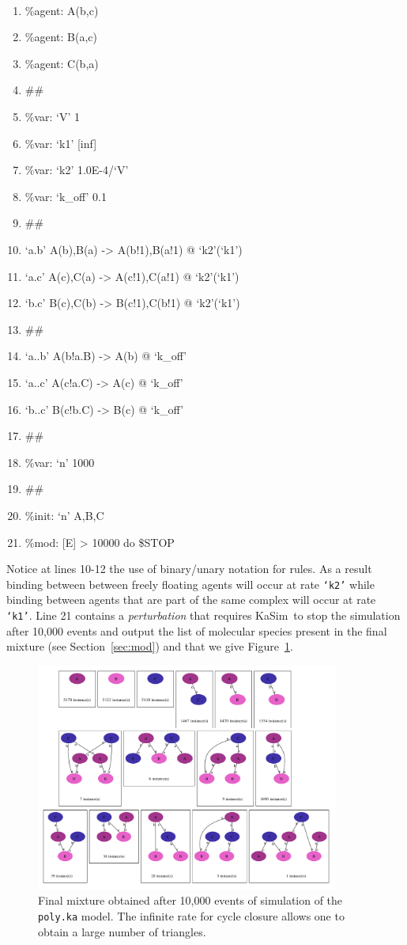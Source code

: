 \documentclass[11pt]{book}
\def\KaSim{\textsf{KaSim}}
\def\ttt#1{\texttt{#1}}
\begin{document}
{\tt\footnotesize
\begin{enumerate}
\item \%agent: A(b,c)
\item \%agent: B(a,c)
\item \%agent: C(b,a)
\item \#\#
\item \%var: `V' 1
\item \%var: `k1' [inf]
\item \%var: `k2' 1.0E-4/`V'
\item \%var: `k\_off' 0.1
\item \#\#
\item `a.b' A(b),B(a) -> A(b!1),B(a!1) @ `k2'(`k1')
\item `a.c' A(c),C(a) -> A(c!1),C(a!1) @ `k2'(`k1')
\item `b.c' B(c),C(b) -> B(c!1),C(b!1) @ `k2'(`k1')
\item \#\#
\item `a..b' A(b!a.B) -> A(b) @ `k\_off'
\item `a..c' A(c!a.C) -> A(c) @ `k\_off'
\item `b..c' B(c!b.C) -> B(c) @ `k\_off'
\item \#\#
\item \%var: `n' 1000
\item \#\#
\item \%init: `n' A,B,C
\item \%mod: [E] > 10000 do \$STOP 
\end{enumerate}
}

Notice at lines 10-12 the use of binary/unary notation for rules. As a result binding between between freely floating agents will occur at rate \ttt{`k2'} while binding between agents that are part of the same complex will occur at rate \ttt{`k1'}. Line 21 contains a \emph{perturbation} that requires \KaSim~to stop the simulation after 10,000 events and output the list of molecular species present in the final mixture (see Section~\ref{sec:mod}) and that we give Figure~\ref{fig:species}.

\begin{figure}[htbp]
\begin{center}
\includegraphics[width=10cm]{img/poly.pdf}
\caption{Final mixture obtained after 10,000 events of simulation of the \ttt{poly.ka} model. The infinite rate for cycle closure allows one to obtain a large number of triangles.}
\label{fig:species}
\end{center}
\end{figure}
\end{document}
